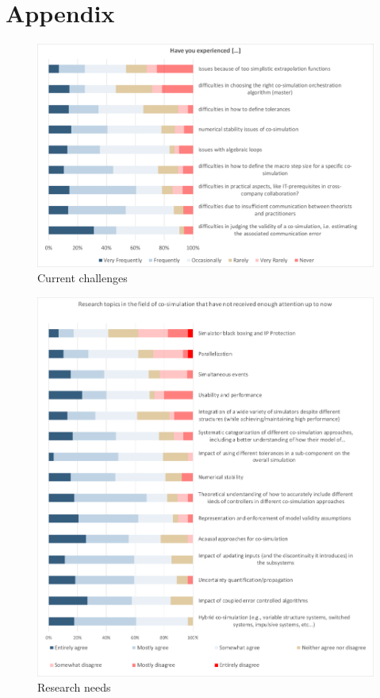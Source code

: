 \section{Appendix}


\begin{figure}[h!]
\centering
\includegraphics[width=1\textwidth]{Figures/Personal.pdf}
\caption{Current challenges}
\label{fig:challenges}
\end{figure}


\begin{figure}[h!]
\centering
\includegraphics[width=1\textwidth]{Figures/Research.pdf}
\caption{Research needs}
\label{fig:ResearchNeeds}
\end{figure}
